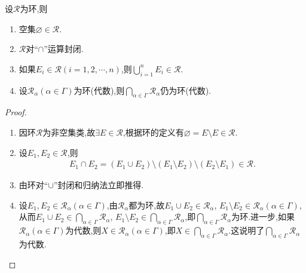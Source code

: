 \documentclass[../../main.tex]{subfiles}%
\begin{document}
\begin{theorem}\label{theorem:集合论定理1.3..948h3}
设$\mathscr{R}$为环,则
\begin{enumerate}[(1)]
\item\label{theorem:集合论定理1.3..948h3-1} 空集$\varnothing \in \mathscr{R}$.
\item\label{theorem:集合论定理1.3..948h3-2} $\mathscr{R}$对“$\cap$”运算封闭.
\item\label{theorem:集合论定理1.3..948h3-3} 如果$E_i \in \mathscr{R}(i=1,2,\cdots,n)$,则$\bigcup_{i=1}^{n} E_i \in \mathscr{R}$.
\item\label{theorem:集合论定理1.3..948h3-4} 设$\mathscr{R}_\alpha(\alpha \in \Gamma)$为环(代数),则$\bigcap_{\alpha \in \Gamma} \mathscr{R}_\alpha$仍为环(代数).
\end{enumerate}
\end{theorem}
\begin{proof}
\begin{enumerate}[(1)]
\item 因环$\mathscr{R}$为非空集类,故$\exists E \in \mathscr{R}$,根据环的定义有$\varnothing = E \setminus E \in \mathscr{R}$.

\item 设$E_1,E_2 \in \mathscr{R}$,则
\begin{align*}
E_1 \cap E_2 = (E_1 \cup E_2) \setminus (E_1 \setminus E_2) \setminus (E_2 \setminus E_1) \in \mathscr{R}.
\end{align*}

\item 由环对“$\cup$”封闭和归纳法立即推得.

\item 设$E_1,E_2 \in \mathscr{R}_\alpha(\alpha \in \Gamma)$,由$\mathscr{R}_\alpha$都为环,故$E_1 \cup E_2 \in \mathscr{R}_\alpha$, $E_1 \setminus E_2 \in \mathscr{R}_\alpha(\alpha \in \Gamma)$,从而$E_1 \cup E_2 \in \bigcap_{\alpha \in \Gamma} \mathscr{R}_\alpha$, $E_1 \setminus E_2 \in \bigcap_{\alpha \in \Gamma} \mathscr{R}_\alpha$,即$\bigcap_{\alpha \in \Gamma} \mathscr{R}_\alpha$为环.进一步,如果$\mathscr{R}_\alpha(\alpha \in \Gamma)$为代数,则$X \in \mathscr{R}_\alpha(\alpha \in \Gamma)$,即$X \in \bigcap_{\alpha \in \Gamma} \mathscr{R}_\alpha$.这说明了$\bigcap_{\alpha \in \Gamma} \mathscr{R}_\alpha$为代数.
\end{enumerate}
\end{proof}
\end{document}
